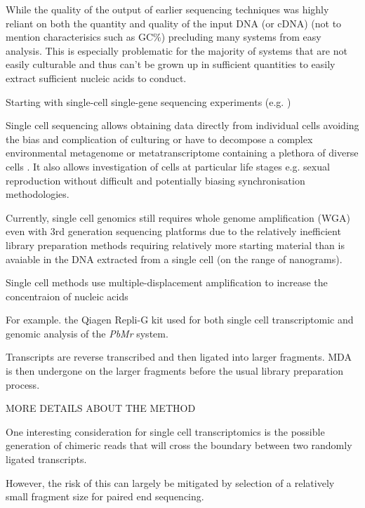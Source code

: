 While the quality of the output of earlier sequencing techniques
was highly reliant on both the quantity and quality of the input DNA (or cDNA) (not to mention
characterisics such as GC\%) precluding many systems from easy analysis.  This is especially
problematic for the majority of systems that are not easily culturable and thus can't be
grown up in sufficient quantities to easily extract sufficient nucleic acids to conduct.



Starting with single-cell single-gene sequencing experiments (e.g. \citep{Kuppers1993}) 


Single cell sequencing allows obtaining data directly from individual cells
avoiding the bias and complication of culturing or have to decompose a complex environmental
metagenome or metatranscriptome containing a plethora of diverse cells \citep{Blainey2013}.  It also allows 
investigation of cells at particular life stages e.g. sexual reproduction without difficult
and potentially biasing synchronisation methodologies.  



Currently, single cell genomics still requires whole genome amplification (WGA) even with 
3rd generation sequencing platforms due to the relatively inefficient library preparation
methods requiring relatively more starting material than is avaiable in the DNA extracted
from a single cell (on the range of nanograms). \citep{Blainey2013} %




Single cell methods use multiple-displacement amplification to increase the concentraion of
nucleic acids 

For example. the Qiagen Repli-G kit used for both single cell transcriptomic and genomic analysis
of the \textit{PbMr} system.

Transcripts are reverse transcribed and then ligated into larger fragments.  MDA
is then undergone on the larger fragments before the usual library preparation process.

MORE DETAILS ABOUT THE METHOD


One interesting consideration for single cell transcriptomics is the possible generation
of chimeric reads that will cross the boundary between two randomly ligated transcripts.

However, the risk of this can largely be mitigated by selection of a relatively small fragment
size for paired end sequencing.

